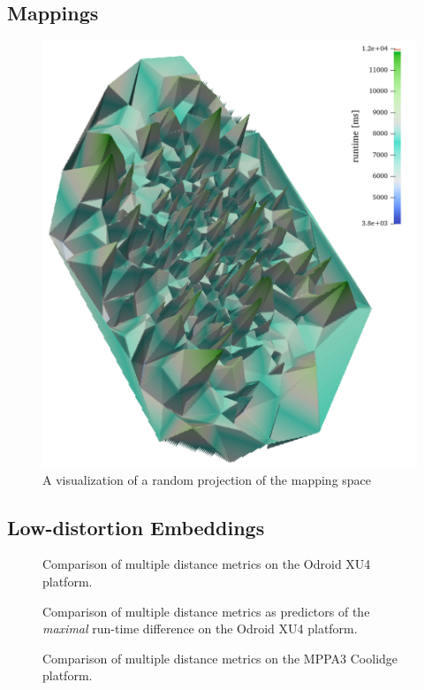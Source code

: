\subsection{Mappings}
\begin{figure}[h]
	\centering
\includegraphics[width=\textwidth]{figures/coolidge-af-space3.png}
	\caption{A visualization of a random projection of the mapping space}
	\label{fig:mapping_space_visualization}
\end{figure}

\subsection{Low-distortion Embeddings}

\begin{figure}[h]
	\centering
	\caption{Comparison of multiple distance metrics on the Odroid XU4 platform.}
	\label{fig:metric_comparison_exynos}
\end{figure}

\begin{figure}[h]
	\centering
	\caption{Comparison of multiple distance metrics as predictors of the \emph{maximal} run-time difference on the Odroid XU4 platform.}
	\label{fig:metric_comparison_max_exynos}
\end{figure}
\begin{figure}[h]
	\centering
	\caption{Comparison of multiple distance metrics on the MPPA3 Coolidge platform.}
	\label{fig:metric_comparison_coolidge}
\end{figure}

